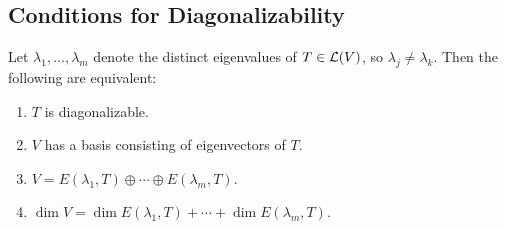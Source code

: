 \subsection{Conditions for Diagonalizability}
\setcounter{thm}{54}
\begin{thm} 
  \label{thm: conditions equivalent to diagonalizability}
  Let $\lambda_1, \dots,\lambda_m$ denote the distinct eigenvalues of $T\in \mathcal{L} (V)$, so $\lambda_j \neq \lambda_k$. Then the following are equivalent:
  \begin{enumerate}[label=\textbf{(\alph*)}]
    \item $T$ is diagonalizable.
    \item $V$ has a basis consisting of eigenvectors of $T$.
    \item $V=E(\lambda_1, T) \oplus \cdots \oplus E(\lambda_m, T).$
    \item $\dim V = \dim E(\lambda_1, T) + \cdots + \dim E(\lambda_m, T)$.
  \end{enumerate}
\end{thm}
